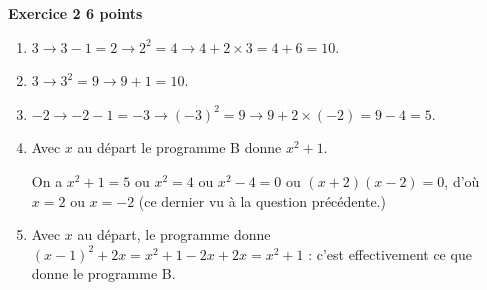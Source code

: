 \textbf{Exercice 2 \hfill 6 points}

\medskip 

%
%
%

\begin{enumerate}
\item %
$3 \to 3 - 1 = 2 \to 2^2 = 4 \to 4 + 2\times 3 = 4 + 6 = 10$. 
\item %
$3 \to 3^2 = 9 \to 9 + 1 = 10$.
\item %
$- 2 \to -2 - 1 = - 3 \to (- 3)^2 = 9 \to 9 + 2 \times (- 2) = 9 - 4 = 5$. 
\item %
Avec $x$ au départ le programme B donne $x^2 + 1$.

On a $x^2 + 1 = 5$ ou $x^2 = 4$ ou $x^2 - 4 = 0$ ou $(x + 2)(x - 2) = 0$, d'où $x = 2$ ou $x = - 2$ (ce dernier vu à la question précédente.)
\item %
Avec $x$ au départ, le programme donne $(x - 1)^2+ 2x = x^2 + 1 - 2x + 2x = x^2 + 1$ : c'est effectivement ce que donne le programme B. 
\end{enumerate}

\bigskip

